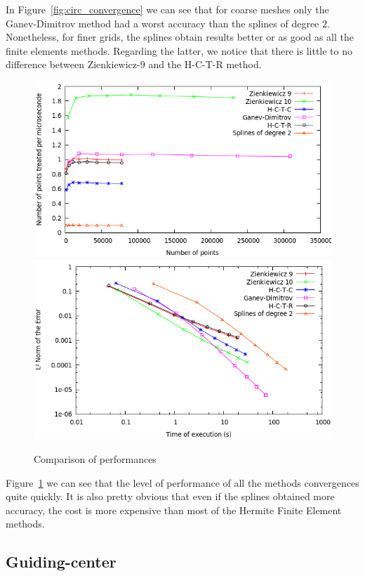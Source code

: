 \documentclass[proc]{edpsmath}
\begin{document}
In Figure~\ref{fig:circ_convergence} we can see that for coarse meshes only the Ganev-Dimitrov method had a worst accuracy than the splines of degree $2$. Nonetheless, for finer grids, the splines obtain results better or as good as all the finite elements methods. Regarding the latter, we notice that there is little to no difference between Zienkiewicz-9 and the H-C-T-R method. 

\begin{figure}[h!]
	\label{fig:circ_performance}
	\includegraphics[scale=0.35]{figures/efficiency.png}
	\includegraphics[scale=0.35]{figures/time_norm.png}
	\caption{Comparison of performances }
\end{figure}

Figure~\ref{fig:circ_performance} we can see that the level of performance of all the methods convergences quite quickly. It is also pretty obvious that even if the splines obtained more accuracy, the cost is more expensive than most of the Hermite Finite Element methods.

\subsection{Guiding-center}
\end{document}
